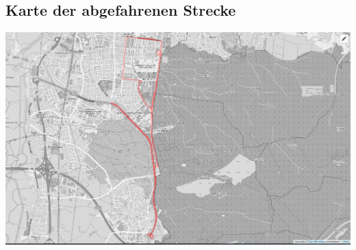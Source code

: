 \subsection*{Karte der abgefahrenen Strecke}
\begin{frame}
	\includegraphics[width=\textwidth]{images/3/karte.png}
\end{frame}